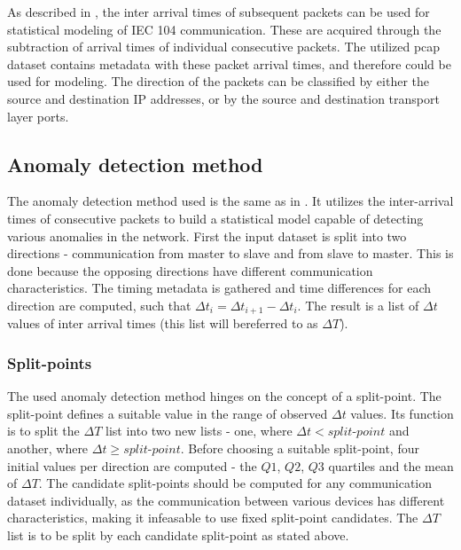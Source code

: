 As described in \cite{burgetova_anomaly}, the inter arrival times of subsequent packets can be used for statistical modeling of
IEC 104 communication. These are acquired through the subtraction of arrival times of individual consecutive packets. The utilized pcap dataset contains metadata
with these packet arrival times, and therefore could be used for modeling. The direction of the packets can be classified by either the source and destination IP
addresses, or by the source and destination transport layer ports.

\subsection{Anomaly detection method}
The anomaly detection method used is the same as in \cite{burgetova_anomaly}. It utilizes the inter-arrival times of consecutive packets to build a
statistical model capable of detecting various anomalies in the network.
First the input dataset is split into two directions - communication from master to slave and from slave to master. This is done because the opposing
directions have different communication characteristics. The timing metadata is gathered and time differences for each direction are computed, such that
$\Delta t_{i} = \Delta t_{i+1} - \Delta t_{i}$. The result is a list of $\Delta t$ values of inter arrival times (this list will bereferred to as $\Delta T$).

\subsubsection{Split-points}
The used anomaly detection method hinges on the concept of a split-point. The split-point defines a suitable value in the range of
observed $\Delta t$ values. Its function is to split the $\Delta T$ list into two new lists - one, where $\Delta t < split\text{-}point$ and another,
where $\Delta t \geq split\text{-}point$. Before choosing a suitable split-point, four initial values per direction are computed - the $Q1$, $Q2$, $Q3$ quartiles
and the mean of $\Delta T$. The candidate split-points should be computed for any communication dataset individually, as the communication between various
devices has different characteristics, making it infeasable to use fixed split-point candidates. The $\Delta T$ list is to be split by each candidate
split-point as stated above.

